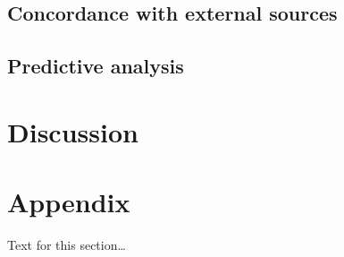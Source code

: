 \documentclass{bmcart}
\begin{document}
\subsection*{Concordance with external sources}  

\subsection*{Predictive analysis}

\section*{Discussion}


\section*{Appendix}
Text for this section\ldots

\end{document}
